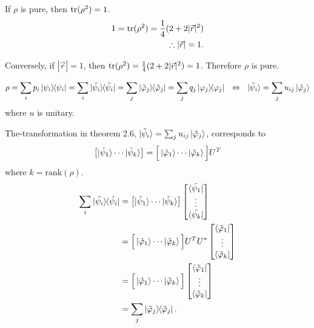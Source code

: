 If $\rho$ is pure, then $\operatorname{tr} (\rho^2) = 1$.
\begin{align*}
   1 =  \operatorname{tr} (\rho^2) = \frac{1}{4} (2 + 2|\vec{r}|^2)\\
   \therefore |\vec{r}| = 1.
\end{align*}

Conversely, if $|\vec{r}| = 1$, then $\operatorname{tr} (\rho^2) = \frac{1}{4} (2 + 2|\vec{r}|^2) = 1$. Therefore $\rho$ is pure.




\begin{screen}
%
    \begin{align*}
        \rho = \sum_i p_i \ket{\psi_i}\hspace{-1mm} \bra{\psi_i}
            = \sum_i \ket{\tilde{\psi_i}}\hspace{-1mm} \bra{\tilde{\psi_i}}
            = \sum_j \ket{\tilde{\varphi}_j}\hspace{-1mm} \bra{\tilde{\varphi}_j}
            = \sum_j q_j \ket{\varphi_j}\hspace{-1mm} \bra{\varphi_j}
                ~~ \Leftrightarrow ~~
            \ket{\tilde{\psi}_i} = \sum_j u_{ij} \ket{\tilde{\varphi}_j}
    \end{align*}
    where $u$ is unitary.

	The-transformation in theorem 2.6, $\ket{\tilde{\psi}_i} = \sum_j u_{ij} \ket{\tilde{\varphi}_j}$, corresponds to
	\begin{align*}
	    \left[ \ket{\tilde{\psi}_1} \cdots \ket{\tilde{\psi}_k} \right] = \Big[ \ket{\tilde{\varphi}_1} \cdots \ket{\tilde{\varphi}_k} \Big] U^T
	\end{align*}
	where $k = \mathrm{rank} (\mathcal{\rho})$.
    \begin{align}
        \sum_i \ket{\tilde{\psi_i}}\hspace{-1mm} \bra{\tilde{\psi_i}} &= \left[ \ket{\tilde{\psi}_1} \cdots \ket{\tilde{\psi}_k} \right]
            \begin{bmatrix}
                \bra{\tilde{\psi_1}}\\
                \vdots\\
                \bra{\tilde{\psi_k}}
            \end{bmatrix}\\
        &= \Big[ \ket{\tilde{\varphi}_1} \cdots \ket{\tilde{\varphi}_k} \Big] U^T
            U^* \begin{bmatrix}
                    \bra{\tilde{\varphi}_1}\\
                    \vdots\\
                    \bra{\tilde{\varphi}_k}
            \end{bmatrix}\\
        &= \Big[ \ket{\tilde{\varphi}_1} \cdots \ket{\tilde{\varphi}_k} \Big]
             \begin{bmatrix}
                \bra{\tilde{\varphi}_1}\\
                \vdots\\
                \bra{\tilde{\varphi}_k}
            \end{bmatrix}\\
        &= \sum_j \ket{\tilde{\varphi}_j}\hspace{-1mm} \bra{\tilde{\varphi}_j}.
    \end{align}
\end{screen}

